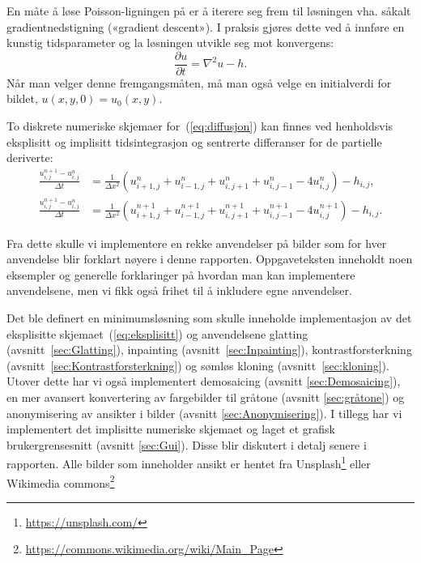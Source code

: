 En måte å løse Poisson-ligningen på er å iterere seg frem til løsningen vha. såkalt gradientnedstigning («gradient descent»). I praksis gjøres dette ved å innføre en kunstig tidsparameter og la løsningen utvikle seg mot konvergens:
\begin{equation}
\frac{\partial u}{\partial t} = \nabla^2 u - h.
\label{eq:diffusjon}
\end{equation}
Når man velger denne fremgangsmåten, må man også velge en initialverdi for bildet, $u(x, y, 0) = u_0(x, y)$.

To diskrete numeriske skjemaer for~(\ref{eq:diffusjon}) kan finnes ved henholdsvis eksplisitt og implisitt tidsintegrasjon og sentrerte differanser for de partielle deriverte:
\begin{align}
  \frac{u^{n+1}_{i,j} - u^n_{i,j}}{\Delta t} &= \frac{1}{\Delta x^2}
                                               (u^n_{i+1,j} +
                                               u^n_{i-1,j} +
                                               u^n_{i,j+1} +
                                               u^n_{i,j-1} -4 
                                               u^n_{i,j}) - h_{i,j},
                                               \label{eq:eksplisitt}  \\
  \frac{u^{n+1}_{i,j} - u^n_{i,j}}{\Delta t} &= \frac{1}{\Delta x^2}
                                               (u^{n+1}_{i+1,j} +
                                               u^{n+1}_{i-1,j} +
                                               u^{n+1}_{i,j+1} +
                                               u^{n+1}_{i,j-1} -4 
                                               u^{n+1}_{i,j}) - h_{i,j}.
                                               \label{eq:implisitt}
\end{align}

Fra dette skulle vi implementere en rekke anvendelser på bilder som for hver anvendelse blir forklart nøyere i denne rapporten. Oppgaveteksten inneholdt noen eksempler og generelle forklaringer på hvordan man kan implementere anvendelsene, men vi fikk også frihet til å inkludere egne anvendelser.

Det ble definert en minimumsløsning som skulle inneholde implementasjon av det eksplisitte skjemaet~(\ref{eq:eksplisitt}) og anvendelsene glatting (avsnitt~\ref{sec:Glatting}), inpainting (avsnitt~\ref{sec:Inpainting}), kontrastforsterkning (avsnitt~\ref{sec:Kontrastforsterkning}) og sømløs kloning (avsnitt~\ref{sec:kloning}). Utover dette har vi også implementert demosaicing (avsnitt \ref{sec:Demosaicing}), en mer avansert konvertering av fargebilder til gråtone (avsnitt \ref{sec:gråtone}) og anonymisering av ansikter i bilder (avsnitt \ref{sec:Anonymisering}). I tillegg har vi implementert det implisitte numeriske skjemaet og laget et grafisk brukergrensesnitt (avsnitt \ref{sec:Gui}). Disse blir diskutert i detalj senere i rapporten. Alle bilder som inneholder ansikt er hentet fra Unsplash\footnote{ \url{https://unsplash.com/}} eller Wikimedia commons\footnote{\url{https://commons.wikimedia.org/wiki/Main_Page}}

